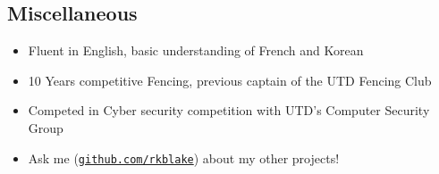 \documentclass[line,margin]{res}
\begin{document}
\begin{resume}
\vspace{-4pt}
\section{Miscellaneous}
\vspace{22pt}
	\begin{itemize} \itemsep -2pt
	\item Fluent in English, basic understanding of French and Korean
	\item 10 Years competitive Fencing, previous captain of the UTD Fencing Club
	\item Competed in Cyber security competition with UTD's Computer Security Group
	\item Ask me (\href{https://github.com/rkblake}{\texttt{github.com/rkblake}}) about my other projects!
	\end{itemize}

\end{resume}
\end{document}
